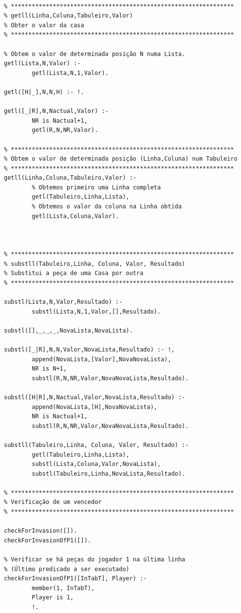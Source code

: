 \documentclass[15pt,a4paper]{article}
\begin{document}
\begin{lstlisting}
        
% ****************************************************************
% getll(Linha,Coluna,Tabuleiro,Valor)
% Obter o valor da casa
% ****************************************************************

% Obtem o valor de determinada posição N numa Lista.
getl(Lista,N,Valor) :-
		getl(Lista,N,1,Valor).

getl([H|_],N,N,H) :- !.

getl([_|R],N,Nactual,Valor) :-
		NR is Nactual+1,
		getl(R,N,NR,Valor).

% ****************************************************************
% Obtem o valor de determinada posição (Linha,Coluna) num Tabuleiro
% ****************************************************************
getll(Linha,Coluna,Tabuleiro,Valor) :-
		% Obtemos primeiro uma Linha completa
		getl(Tabuleiro,Linha,Lista),
		% Obtemos o valor da coluna na Linha obtida
		getl(Lista,Coluna,Valor).

                 
                 
% ****************************************************************
% substll(Tabuleiro,Linha, Coluna, Valor, Resultado)
% Substitui a peça de uma Casa por outra
% ****************************************************************

substl(Lista,N,Valor,Resultado) :-
        substl(Lista,N,1,Valor,[],Resultado).

substl([],_,_,_,NovaLista,NovaLista).

substl([_|R],N,N,Valor,NovaLista,Resultado) :- !,
		append(NovaLista,[Valor],NovaNovaLista),
		NR is N+1,
		substl(R,N,NR,Valor,NovaNovaLista,Resultado).

substl([H|R],N,Nactual,Valor,NovaLista,Resultado) :-
		append(NovaLista,[H],NovaNovaLista),
		NR is Nactual+1,
		substl(R,N,NR,Valor,NovaNovaLista,Resultado).

substll(Tabuleiro,Linha, Coluna, Valor, Resultado) :-
		getl(Tabuleiro,Linha,Lista),
		substl(Lista,Coluna,Valor,NovaLista),
		substl(Tabuleiro,Linha,NovaLista,Resultado).

% ****************************************************************
% Verificação de um vencedor
% ****************************************************************

checkForInvasion([]).
checkForInvasionOfP1([]).

% Verificar se há peças do jogador 1 na última linha
% (Último predicado a ser executado)
checkForInvasionOfP1([InTabT], Player) :-
		member(1, InTabT),
		Player is 1,
		!.


\end{lstlisting}
\end{document}
